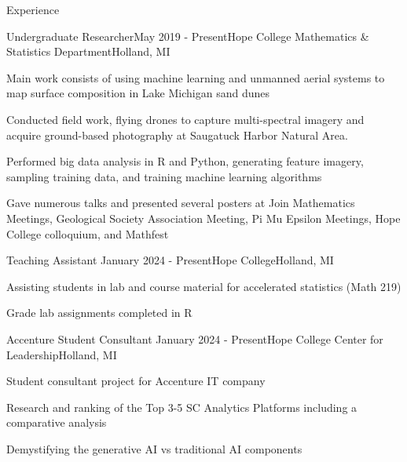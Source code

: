 \documentclass[
	11pt, %
]{resume} %
\begin{document}

\begin{rSection}{Experience}



  \begin{rSubsection}{Undergraduate Researcher}{May 2019 - Present}{Hope College Mathematics \& Statistics Department}{Holland, MI}
  \item Main work consists of using machine learning and unmanned aerial systems to map surface composition in Lake Michigan sand dunes
  \item Conducted field work, flying drones to capture multi-spectral imagery and acquire  ground-based photography  at Saugatuck Harbor Natural Area.
  \item Performed big data analysis in R and Python, generating feature imagery, sampling training data, and training machine learning algorithms
  \item Gave numerous talks and presented several posters at Join Mathematics Meetings, Geological Society Association Meeting, Pi Mu Epsilon Meetings, Hope College colloquium, and Mathfest
	\end{rSubsection}


\pagebreak
	\begin{rSubsection}{Teaching Assistant}{ January 2024 - Present}{Hope College}{Holland, MI}
    \item Assisting students in lab and course material for accelerated statistics (Math 219)
    \item Grade lab assignments completed in R
	\end{rSubsection}

	\begin{rSubsection}{Accenture Student Consultant}{ January 2024 - Present}{Hope College Center for Leadership}{Holland, MI}
    \item Student consultant project for Accenture IT company 
    \item Research and ranking of the Top 3-5 SC Analytics Platforms including a comparative analysis
    \item Demystifying the generative AI vs traditional AI components
	\end{rSubsection}



\end{rSection}
\end{document}
